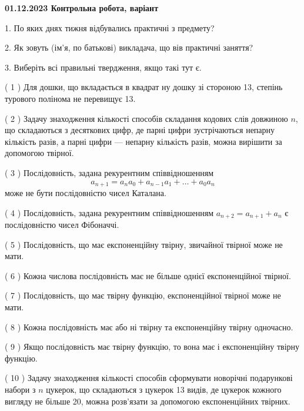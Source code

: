 \documentclass[12pt, ukrainian]{article}
\begin{document}
\vspace{4mm}
\newpage
\begin {large}

\textbf{01.12.2023 Контрольна робота, варіант  }\par


{
1. По яких днях тижня відбувались практичні з предмету?



\vspace{5mm}
2. Як зовуть (ім'я, по батькові) викладача, що вів практичні заняття?



\vspace{5mm}
3. Виберіть всі правильні твердження, якщо такі тут є.\par
\vspace{2mm}
( 1 ) Для дошки, що вкладається в квадрат ну дошку зі стороною 13, степінь турового полінома не перевищує 13.%

( 2 ) Задачу знаходження кількості способів складання кодових слів довжиною $n$, що складаються з десяткових цифр, де парні цифри зустрічаються непарну кількість разів, а парні цифри — непарну кількість разів, можна вирішити за допомогою твірної.%

( 3 ) Послідовність, задана рекурентним співвідношенням $$a_{n+1}=a_{n}a_{0}+a_{n-1}a_{1}+\ldots+a_0a_{n}$$ може не бути послідовністю чисел Каталана.%

( 4 ) Послідовність, задана рекурентним співвідношенням $a_{n+2}=a_{n+1}+a_{n}$ є послідовністю чисел Фібоначчі.%

( 5 ) Послідовність, що має експоненційну твірну, звичайної твірної може не мати.%

( 6 ) Кожна числова послідовність має не більше однієї  експоненційної твірної.%

( 7 ) Послідовність, що має твірну функцію, експоненційної твірної може не мати.%

( 8 ) Кожна послідовність має або ні твірну та експоненційну твірну одночасно.%

( 9 ) Якщо послідовність має твірну функцію, то вона має і експоненційну твірну функцію.%

( 10 ) Задачу знаходження кількості способів сформувати новорічні подарункові набори з $n$ цукерок, що складаються з цукерок 13 видів, де цукерок кожного вигляду не більше 20, можна розв’язати за допомогою експоненційних твірних.%
}
\end {large}
\end{document}
